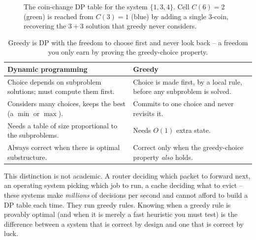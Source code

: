 \begin{figure}[h]
\centering
{}
\caption{The coin-change DP table for the system $\{1,3,4\}$. Cell $C(6)=2$
(green) is reached from $C(3)=1$ (blue) by adding a single $3$-coin, recovering
the $3+3$ solution that greedy never considers.}
\label{ch16:coin-dp}
\end{figure}

\begin{table}[h]
\centering
\begin{tabular}{p{} p{}}
\toprule
\textbf{Dynamic programming} & \textbf{Greedy} \\
\midrule
Choice depends on subproblem solutions; must compute them first. & Choice is made first, by a local rule, before any subproblem is solved. \\
Considers many choices, keeps the best (a $\min$ or $\max$). & Commits to one choice and never revisits it. \\
Needs a table of size proportional to the subproblems. & Needs $O(1)$ extra state. \\
Always correct when there is optimal substructure. & Correct only when the greedy-choice property \emph{also} holds. \\
\bottomrule
\end{tabular}
\caption{Greedy is DP with the freedom to choose first and never look back -- a
freedom you only earn by proving the greedy-choice property.}
\label{ch16:dp-vs-greedy}
\end{table}

\begin{aestheticbox}
This distinction is not academic. A router deciding which packet to forward
next, an operating system picking which job to run, a cache deciding what to
evict -- these systems make \emph{millions} of decisions per second and cannot
afford to build a DP table each time. They run greedy rules. Knowing when a
greedy rule is provably optimal (and when it is merely a fast heuristic you must
test) is the difference between a system that is correct by design and one that
is correct by luck.
\end{aestheticbox}

